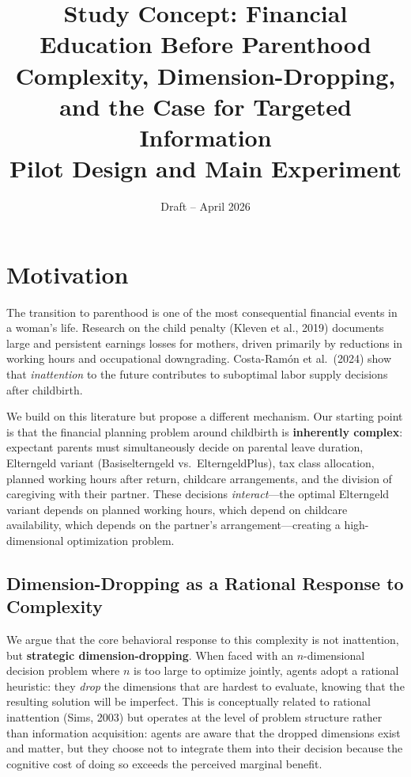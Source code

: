 \documentclass[12pt,a4paper]{article}
\title{\textbf{Study Concept: Financial Education Before Parenthood}\\[0.3em]
\large Complexity, Dimension-Dropping, and the Case for Targeted Information\\[0.2em]
Pilot Design and Main Experiment}
\author{Draft -- April 2026}
\date{}
\begin{document}
\maketitle
\thispagestyle{empty}

\section{Motivation}

The transition to parenthood is one of the most consequential financial events in a woman's life. Research on the child penalty (Kleven et al., 2019) documents large and persistent earnings losses for mothers, driven primarily by reductions in working hours and occupational downgrading. Costa-Ram\'on et al.\ (2024) show that \emph{inattention} to the future contributes to suboptimal labor supply decisions after childbirth.

We build on this literature but propose a different mechanism. Our starting point is that the financial planning problem around childbirth is \textbf{inherently complex}: expectant parents must simultaneously decide on parental leave duration, Elterngeld variant (Basiselterngeld vs.\ ElterngeldPlus), tax class allocation, planned working hours after return, childcare arrangements, and the division of caregiving with their partner. These decisions \emph{interact}---the optimal Elterngeld variant depends on planned working hours, which depend on childcare availability, which depends on the partner's arrangement---creating a high-dimensional optimization problem.

\subsection{Dimension-Dropping as a Rational Response to Complexity}

We argue that the core behavioral response to this complexity is not inattention, but \textbf{strategic dimension-dropping}. When faced with an $n$-dimensional decision problem where $n$ is too large to optimize jointly, agents adopt a rational heuristic: they \emph{drop} the dimensions that are hardest to evaluate, knowing that the resulting solution will be imperfect. This is conceptually related to rational inattention (Sims, 2003) but operates at the level of problem structure rather than information acquisition: agents are aware that the dropped dimensions exist and matter, but they choose not to integrate them into their decision because the cognitive cost of doing so exceeds the perceived marginal benefit.
\end{document}
